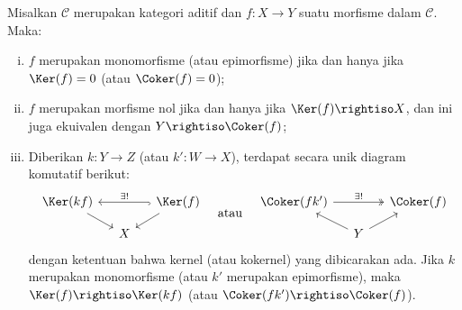 \begin{lema}\label{prop:mono-epi-ker-coker}
	Misalkan $\mathcal{C}$ merupakan kategori aditif dan $f: X \to Y$ suatu
	morfisme dalam $\mathcal{C}$. Maka:
	\begin{enumerate}[(i)]
		\item $f$ merupakan monomorfisme (atau epimorfisme) jika dan hanya jika
		$\Ker(f)=0$ (atau $\Coker(f)=0$);
		\item $f$ merupakan morfisme nol jika dan hanya jika
		$\Ker(f) \rightiso X$, dan ini juga ekuivalen dengan
		$Y \rightiso \Coker(f)$;
		\item Diberikan $k: Y \to Z$ (atau $k': W \to X$), terdapat secara unik
		diagram komutatif berikut:
		\[\begin{tikzcd}[row sep=small, column sep=small]
		\Ker(kf) \arrow[rd] & & \Ker(f) \arrow[ld] \arrow[hookrightarrow, ll, "\exists !"'] \\
		& X &
		\end{tikzcd} \quad \text{atau} \quad
		\begin{tikzcd}[row sep=small, column sep=small]
		\Coker(fk') \arrow[twoheadrightarrow, rr, "\exists !"] & & \Coker(f) \\
		& Y \arrow[lu] \arrow[ru] &
		\end{tikzcd}\]
		dengan ketentuan bahwa kernel (atau kokernel) yang dibicarakan ada. Jika
		$k$ merupakan monomorfisme (atau $k'$ merupakan epimorfisme), maka
		$\Ker(f) \rightiso \Ker(kf)$ (atau
		$\Coker(fk') \rightiso \Coker(f)$).
	\end{enumerate}
\end{lema}

